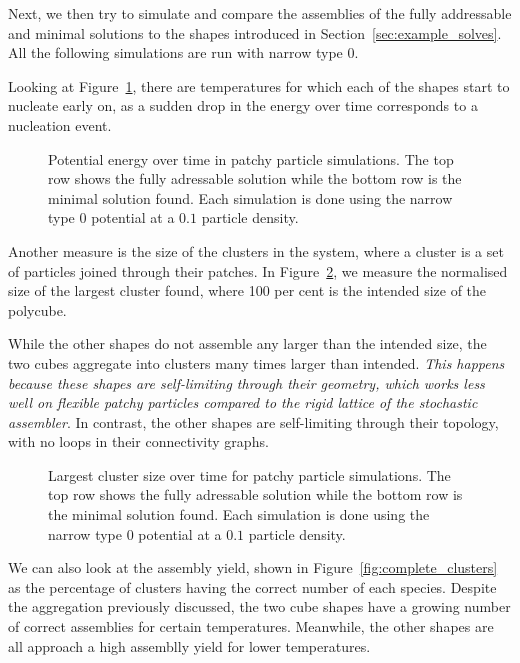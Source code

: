 Next, we then try to simulate and compare the assemblies of the fully addressable and minimal solutions to the shapes introduced in Section~\ref{sec:example_solves}. All the following simulations are run with narrow type 0.

Looking at Figure~\ref{fig:patchy_energy}, there are temperatures for which each of the shapes start to nucleate early on, as a sudden drop in the energy over time corresponds to a nucleation event.

\begin{figure}[h]
    \centering
    \caption{Potential energy over time in patchy particle simulations. The top row shows the fully adressable solution while the bottom row is the minimal solution found. Each simulation is done using the narrow type \(0\) potential at a \(0.1\) particle density.}
    \label{fig:patchy_energy}
\end{figure}

Another measure is the size of the clusters in the system, where a cluster is a set of particles joined through their patches. In Figure~\ref{fig:max_cluster}, we measure the normalised size of the largest cluster found, where 100 per cent is the intended size of the polycube. 

While the other shapes do not assemble any larger than the intended size, the two cubes aggregate into clusters many times larger than intended. \emph{This happens because these shapes are self-limiting through their geometry, which works less well on flexible patchy particles compared to the rigid lattice of the stochastic assembler}. In contrast, the other shapes are self-limiting through their topology, with no loops in their connectivity graphs.

\begin{figure}[h]
    \centering
    \caption{Largest cluster size over time for patchy particle simulations. The top row shows the fully adressable solution while the bottom row is the minimal solution found. Each simulation is done using the narrow type \(0\) potential at a \(0.1\) particle density.}
    \label{fig:max_cluster}
\end{figure}

We can also look at the assembly yield, shown in Figure~\ref{fig:complete_clusters} as the percentage of clusters having the correct number of each species. Despite the aggregation previously discussed, the two cube shapes have a growing number of correct assemblies for certain temperatures. Meanwhile, the other shapes are all approach a high assemblly yield for lower temperatures.

